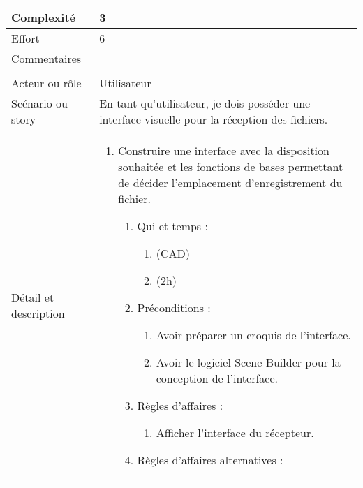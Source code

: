 \begin{longtable}{|l|p{}|}
\hline
    Complexité & 3 \\
\hline
    Effort & 6 \\
\hline
    Commentaires & \\

\hline
    \rowcolor{Gray}
    \multicolumn{2}{|l|}{2} \\
\hline
    Acteur ou rôle & Utilisateur \\
\hline
    Scénario ou story & En tant qu’utilisateur, je dois posséder une interface visuelle pour la réception des fichiers. \\
\hline
    Détail et description &
        \begin{enumerate}[label*=\arabic*.]
            \item Construire une interface avec la disposition souhaitée et les fonctions de bases permettant de décider l’emplacement d’enregistrement du fichier.
                \begin{enumerate}[label*=\arabic*.]
                                \item Qui et temps :
                                \begin{enumerate}[label*=\arabic*.]
                                    \item (CAD)
                                    \item (2h)
                                \end{enumerate}
                                \item Préconditions :
                                \begin{enumerate}[label*=\arabic*.]
                                    \item Avoir préparer un croquis de l'interface.
                                    \item Avoir le logiciel Scene Builder pour la conception de l'interface.
                                \end{enumerate}
                                \item Règles d'affaires :
                                \begin{enumerate}[label*=\arabic*.]
                                    \item Afficher l'interface du récepteur.
                                \end{enumerate}
                                \item Règles d'affaires alternatives :
                                \begin{enumerate}[label*=\arabic*.]

\end{enumerate}
\end{enumerate}
\end{enumerate}
\end{longtable}
